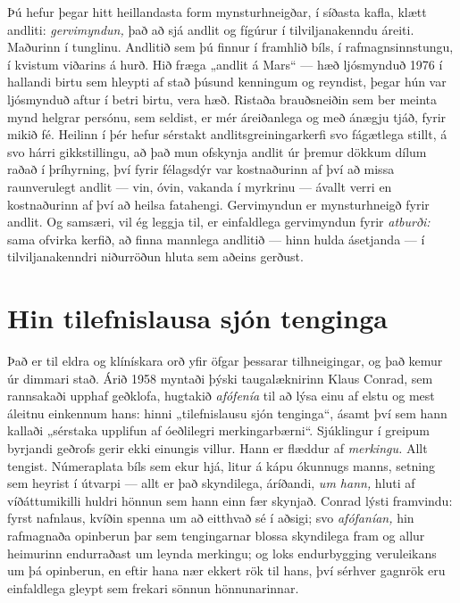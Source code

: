 Þú hefur þegar hitt heillandasta form mynsturhneigðar, í síðasta kafla, klætt andliti: \emph{gervimyndun,} það að sjá andlit og fígúrur í tilviljanakenndu áreiti. Maðurinn í tunglinu. Andlitið sem þú finnur í framhlið bíls, í rafmagnsinnstungu, í kvistum viðarins á hurð. Hið fræga „andlit á Mars“ — hæð ljósmynduð 1976 í hallandi birtu sem hleypti af stað þúsund kenningum og reyndist, þegar hún var ljósmynduð aftur í betri birtu, vera hæð. Ristaða brauðsneiðin sem ber meinta mynd helgrar persónu, sem seldist, er mér áreiðanlega og með ánægju tjáð, fyrir mikið fé. Heilinn í þér hefur sérstakt andlitsgreiningarkerfi svo fágætlega stillt, á svo hárri gikkstillingu, að það mun ofskynja andlit úr þremur dökkum dílum raðað í þríhyrning, því fyrir félagsdýr var kostnaðurinn af því að missa raunverulegt andlit — vin, óvin, vakanda í myrkrinu — ávallt verri en kostnaðurinn af því að heilsa fatahengi. Gervimyndun er mynsturhneigð fyrir andlit. Og samsæri, vil ég leggja til, er einfaldlega gervimyndun fyrir \emph{atburði:} sama ofvirka kerfið, að finna mannlega andlitið — hinn hulda ásetjanda — í tilviljanakenndri niðurröðun hluta sem aðeins gerðust.

\section*{Hin tilefnislausa sjón tenginga}

Það er til eldra og klínískara orð yfir öfgar þessarar tilhneigingar, og það kemur úr dimmari stað. Árið 1958 myntaði þýski taugalæknirinn Klaus Conrad, sem rannsakaði upphaf geðklofa, hugtakið \emph{afófenía} til að lýsa einu af elstu og mest áleitnu einkennum hans: hinni „tilefnislausu sjón tenginga“, ásamt því sem hann kallaði „sérstaka upplifun af óeðlilegri merkingarbærni“. Sjúklingur í greipum byrjandi geðrofs gerir ekki einungis villur. Hann er flæddur af \emph{merkingu.} Allt tengist. Númeraplata bíls sem ekur hjá, litur á kápu ókunnugs manns, setning sem heyrist í útvarpi — allt er það skyndilega, áríðandi, \emph{um hann,} hluti af víðáttumikilli huldri hönnun sem hann einn fær skynjað. Conrad lýsti framvindu: fyrst nafnlaus, kvíðin spenna um að eitthvað sé í aðsigi; svo \emph{afófanían,} hin rafmagnaða opinberun þar sem tengingarnar blossa skyndilega fram og allur heimurinn endurraðast um leynda merkingu; og loks endurbygging veruleikans um þá opinberun, en eftir hana nær ekkert rök til hans, því sérhver gagnrök eru einfaldlega gleypt sem frekari sönnun hönnunarinnar.

